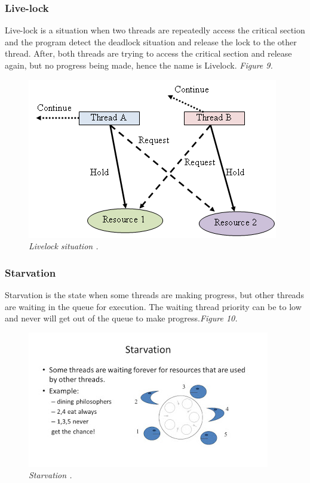 \documentclass[12pt]{article}
\begin{document}
	\subsubsection{Live-lock}
Live-lock is a  situation when two threads are repeatedly access the critical section and the program detect the deadlock situation and release the lock to the other thread. After, both threads are trying to access the critical section and release again, but no progress being made, hence the name is Livelock. \textit{\color{gray}Figure 9.}

\begin{figure}[h!]
\centering
\includegraphics[scale=0.5]{Pictures/livelock.png}
\caption{\textit{\color{gray}Livelock situation \cite{installsetupconfig}.}}
\end{figure}

	\subsubsection{Starvation}
Starvation is the state when some threads are making progress, but other threads are waiting in the queue for execution. The waiting thread priority can be to low and never will get out of the queue to make progress.\textit{\color{gray}Figure 10.}

\begin{figure}[h!]
\centering
\includegraphics[scale=0.6]{Pictures/starvation.jpg}
\caption{\textit{\color{gray}Starvation \cite{Sitansu}.}}
\end{figure}
\clearpage
\end{document}
